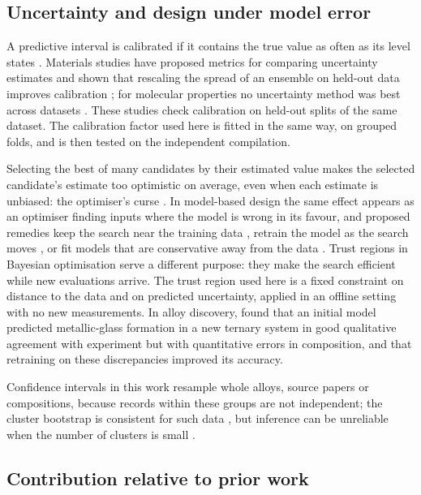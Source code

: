 \subsection{Uncertainty and design under model error}

A predictive interval is calibrated if it contains the true value as often as its level states
\citep{kuleshov2018accurate}. Materials studies have proposed metrics for comparing uncertainty
estimates \citep{tran2020methods} and shown that rescaling the spread of an ensemble on held-out data
improves calibration \citep{palmer2022calibration}; for molecular properties no uncertainty method was
best across datasets \citep{hirschfeld2020uncertainty}. These studies check calibration on held-out
splits of the same dataset. The calibration factor used here is fitted in the same way, on grouped
folds, and is then tested on the independent compilation.

Selecting the best of many candidates by their estimated value makes the selected candidate's estimate
too optimistic on average, even when each estimate is unbiased: the optimiser's curse
\citep{smith2006optimizer}. In model-based design the same effect appears as an optimiser finding
inputs where the model is wrong in its favour, and proposed remedies keep the search near the training
data \citep{brookes2019conditioning}, retrain the model as the search moves \citep{fannjiang2020autofocused},
or fit models that are conservative away from the data \citep{trabucco2021conservative}. Trust regions
in Bayesian optimisation \citep{eriksson2019scalable} serve a different purpose: they make the search
efficient while new evaluations arrive. The trust region used here is a fixed constraint on distance to
the data and on predicted uncertainty, applied in an offline setting with no new measurements. In
alloy discovery, \citet{ren2018accelerated} found that an initial model predicted metallic-glass
formation in a new ternary system in good qualitative agreement with experiment but with quantitative
errors in composition, and that retraining on these discrepancies improved its accuracy.

Confidence intervals in this work resample whole alloys, source papers or compositions, because records
within these groups are not independent; the cluster bootstrap is consistent for such data
\citep{field2007bootstrapping}, but inference can be unreliable when the number of clusters is small
\citep{cameron2008bootstrap}.

\subsection{Contribution relative to prior work}

